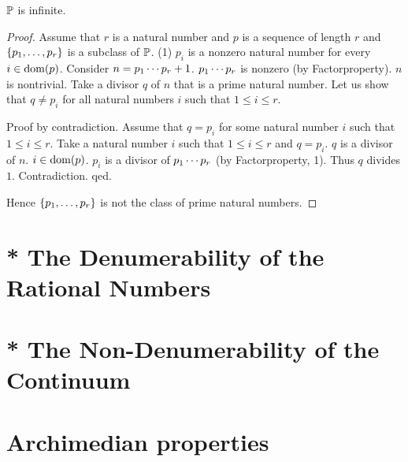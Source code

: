 \documentclass{article}
\begin{document}
\begin{theorem}[Euclid]
$\mathbb{P}$ is infinite.
\end{theorem}
\begin{proof}
Assume that $r$ is a natural number and
$p$ is a sequence of length $r$ and
$\{p_{1},\dots,p_{r}\}$ is a subclass of $\mathbb{P}$.
(1) $p_{i}$ is a nonzero natural number for every
$i \in  \operatorname{dom}(p)$.
Consider $n=p_{1} \cdots p_{r}+1$.
$p_{1} \cdots p_{r}$ is nonzero (by Factorproperty).
$n$ is nontrivial.
Take a divisor $q$ of $n$ that is a prime natural number.
Let us show that $q \neq p_{i}$ 
for all natural numbers $i$ such that $1 \leq i \leq r$.

Proof by contradiction.
Assume that $q=p_{i}$ for some natural number $i$ such that
$1 \leq i \leq r$.
Take a natural number $i$ such that $1 \leq i \leq r$
and $q=p_{i}$.
$q$ is a divisor of $n$.
$i \in \operatorname{dom}(p)$. $p_{i}$ is a divisor of $p_{1} \cdots p_{r}$
(by Factorproperty, 1).
Thus $q$ divides $1$.
Contradiction. qed.

Hence $\{p_{1},\dots,p_{r}\}$ is not the class of prime natural numbers.
\end{proof}


\section{* The Denumerability of the Rational Numbers}

\section{* The Non-Denumerability of the Continuum}

\section{Archimedian properties}
\end{document}
